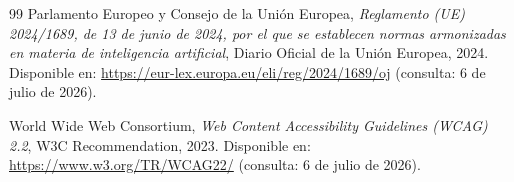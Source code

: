 \begin{sloppypar}
\begin{thebibliography}{99}
Parlamento Europeo y Consejo de la Unión Europea, \textit{Reglamento (UE) 2024/1689, de 13 de junio de 2024, por el que se establecen normas armonizadas en materia de inteligencia artificial}, Diario Oficial de la Unión Europea, 2024. Disponible en: \url{https://eur-lex.europa.eu/eli/reg/2024/1689/oj} (consulta: 6 de julio de 2026).

World Wide Web Consortium, \textit{Web Content Accessibility Guidelines (WCAG) 2.2}, W3C Recommendation, 2023. Disponible en: \url{https://www.w3.org/TR/WCAG22/} (consulta: 6 de julio de 2026).

\end{thebibliography}
\end{sloppypar}
